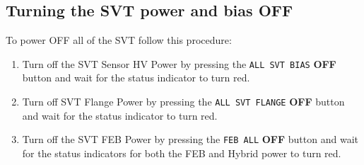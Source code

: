 \documentclass[12pt]{report}
\begin{document}
%
%
%
%
%
%
%
%
%
%



\subsection{Turning the SVT power and bias OFF}
\label{sec:proc_voltages_alloff}
To power OFF all of the SVT follow this procedure:
\begin{enumerate}
\item Turn off the SVT Sensor HV Power by pressing the \texttt{ALL SVT BIAS} \textbf{OFF} button and wait for the status indicator to turn red.
\item Turn off SVT Flange Power by pressing the \texttt{ALL SVT FLANGE} \textbf{OFF} button and wait for the status indicator to turn red.
\item Turn off the SVT FEB Power by pressing the \texttt{FEB ALL} \textbf{OFF} button and wait for the status indicators for both the FEB and Hybrid power to turn red.
\end{enumerate}
\end{document}
